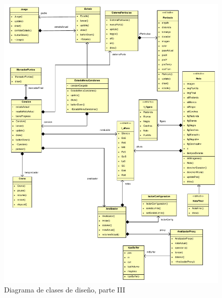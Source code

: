\begin{figure}[htp!]
  \centering
  \includegraphics[width=\textwidth, clip=true, trim=0cm 0cm 0cm 0cm]{5_diseno/diagrama3}
  \caption{Diagrama de clases de diseño, parte III}
  \label{fig:diagrama_clases_3}
\end{figure}

